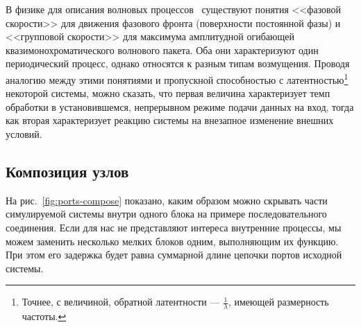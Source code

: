 \begin{digression}%

В физике для описания волновых процессов~\cite{sivukhin-vol5} существуют понятия <<фазовой скорости>> для движения фазового фронта (поверхности постоянной фазы) и <<групповой скорости>> для максимума амплитудной огибающей квазимонохроматического волнового пакета. Оба они характеризуют один периодический процесс, однако относятся к разным типам возмущения. Проводя аналогию между этими понятиями и пропускной способностью с латентностью\footnote{Точнее, с величиной, обратной латентности --- $\frac{1}{\lambda}$, имеющей размерность частоты.} некоторой системы, можно сказать, что первая величина характеризует темп обработки в установившемся, непрерывном режиме подачи данных на вход, тогда как вторая характеризует реакцию системы на внезапное изменение внешних условий.
\end{digression}


\subsection{Композиция узлов}

На рис.~\ref{fig:ports-compose} показано, каким образом можно скрывать части симулируемой системы внутри одного блока на примере последовательного соединения. Если для нас не представляют интереса внутренние процессы, мы можем заменить несколько мелких блоков одним, выполняющим их функцию. При этом его задержка будет равна суммарной длине цепочки портов исходной системы.

